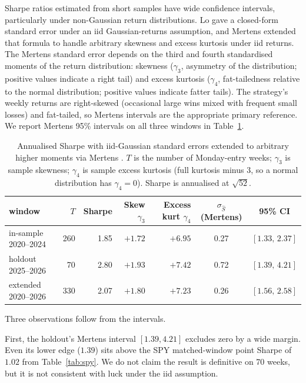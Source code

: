 \documentclass[11pt]{article}
\theoremstyle{definition}
\theoremstyle{remark}
\begin{document}
Sharpe ratios estimated from short samples have wide confidence
intervals, particularly under non-Gaussian return distributions.
Lo \cite{lo2002sharpe} gave a closed-form standard error under an
iid Gaussian-returns assumption, and Mertens \cite{mertens2002sharpe}
extended that formula to handle arbitrary skewness and excess
kurtosis under iid returns. The Mertens standard error depends on
the third and fourth standardised moments of the return
distribution: skewness ($\gamma_3$, asymmetry of the
distribution; positive values indicate a right tail) and excess
kurtosis ($\gamma_4$, fat-tailedness relative to the normal
distribution; positive values indicate fatter tails). The
strategy's weekly returns are right-skewed (occasional large wins
mixed with frequent small losses) and fat-tailed, so Mertens
intervals are the appropriate primary reference. We report
Mertens 95\% intervals on all three windows in
Table~\ref{tab:sharpe-ci}.

\begin{table}[htbp]
\centering
\small
\begin{tabular}{lrrrrcc}
\toprule
window                & $T$ & Sharpe & Skew $\gamma_3$ & Excess kurt $\gamma_4$ & $\sigma_{\hat S}$(Mertens) & 95\% CI \\
\midrule
in-sample 2020--2024  & 260 & 1.85 & $+1.72$ & $+6.95$ & 0.27 & $[1.33,\,2.37]$ \\
holdout 2025--2026    &  70 & 2.80 & $+1.93$ & $+7.42$ & 0.72 & $[1.39,\,4.21]$ \\
extended 2020--2026   & 330 & 2.07 & $+1.80$ & $+7.23$ & 0.26 & $[1.56,\,2.58]$ \\
\bottomrule
\end{tabular}
\caption{Annualised Sharpe with iid-Gaussian
\cite{lo2002sharpe} standard errors extended to arbitrary higher
moments via Mertens \cite{mertens2002sharpe}. $T$ is the number
of Monday-entry weeks; $\gamma_3$ is sample skewness; $\gamma_4$
is sample excess kurtosis (full kurtosis minus 3, so a normal
distribution has $\gamma_4 = 0$). Sharpe is annualised at
$\sqrt{52}$.}
\label{tab:sharpe-ci}
\end{table}

Three observations follow from the intervals.

First, the holdout's Mertens interval $[1.39, 4.21]$ excludes zero
by a wide margin. Even its lower edge ($1.39$) sits above the SPY
matched-window point Sharpe of $1.02$ from Table~\ref{tab:spy}. We
do not claim the result is definitive on 70 weeks, but it is not
consistent with luck under the iid assumption.
\end{document}
